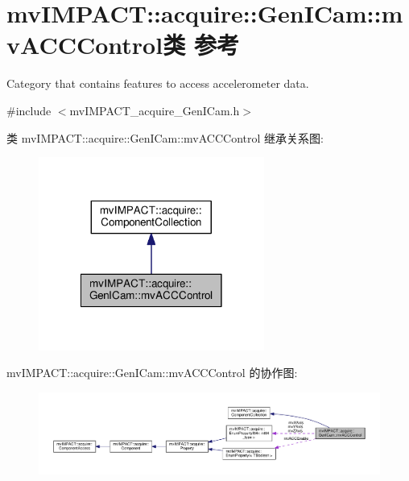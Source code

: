 \hypertarget{classmv_i_m_p_a_c_t_1_1acquire_1_1_gen_i_cam_1_1mv_a_c_c_control}{\section{mv\+I\+M\+P\+A\+C\+T\+:\+:acquire\+:\+:Gen\+I\+Cam\+:\+:mv\+A\+C\+C\+Control类 参考}
\label{classmv_i_m_p_a_c_t_1_1acquire_1_1_gen_i_cam_1_1mv_a_c_c_control}
}


Category that contains features to access accelerometer data.  




{\ttfamily \#include $<$mv\+I\+M\+P\+A\+C\+T\+\_\+acquire\+\_\+\+Gen\+I\+Cam.\+h$>$}



类 mv\+I\+M\+P\+A\+C\+T\+:\+:acquire\+:\+:Gen\+I\+Cam\+:\+:mv\+A\+C\+C\+Control 继承关系图\+:
\nopagebreak
\begin{figure}[H]
\begin{center}
\leavevmode
\includegraphics[width=210pt]{classmv_i_m_p_a_c_t_1_1acquire_1_1_gen_i_cam_1_1mv_a_c_c_control__inherit__graph}
\end{center}
\end{figure}


mv\+I\+M\+P\+A\+C\+T\+:\+:acquire\+:\+:Gen\+I\+Cam\+:\+:mv\+A\+C\+C\+Control 的协作图\+:
\nopagebreak
\begin{figure}[H]
\begin{center}
\leavevmode
\includegraphics[width=350pt]{classmv_i_m_p_a_c_t_1_1acquire_1_1_gen_i_cam_1_1mv_a_c_c_control__coll__graph}
\end{center}
\end{figure}

